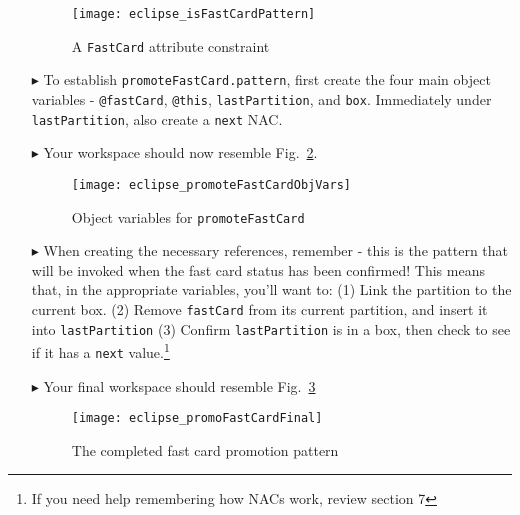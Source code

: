 \begin{itemize}
\begin{figure}[htp]
\begin{center}
  \texttt{[image: eclipse\_isFastCardPattern]}
  \caption{A \texttt{FastCard} attribute constraint}
  \label{fig:isFastCardPattern}
\end{center}
\end{figure}

\item[$\blacktriangleright$] To establish \texttt{promoteFastCard.pattern}, first create the four main object variables - \texttt{@fastCard}, \texttt{@this},
\texttt{lastPartition}, and \texttt{box}. Immediately under \texttt{lastPartition}, also create a \texttt{next} NAC.

\vspace{0.5cm}

\item[$\blacktriangleright$] Your workspace should now resemble Fig.~\ref{fig:objVarFastCard}.

\begin{figure}[htp]
\begin{center}
  \texttt{[image: eclipse\_promoteFastCardObjVars]}
  \caption{Object variables for \texttt{promoteFastCard}}
  \label{fig:objVarFastCard}
\end{center}
\end{figure}

\item[$\blacktriangleright$] When creating the necessary references, remember - this is the pattern that will be invoked when the fast card status has been
confirmed! This means that, in the appropriate variables, you'll want to:
(1) Link the partition to the current box.
(2) Remove \texttt{fastCard} from its current partition, and insert it into \texttt{lastPartition}
(3) Confirm \texttt{lastPartition} is in a box, then check to see if it has a \texttt{next} value.\footnote{If you need help remembering how NACs work, review
section 7}

\vspace{0.5cm}

\item[$\blacktriangleright$] Your final workspace should resemble Fig.~\ref{fig:promoFastCardFinal}

\newpage

\vspace*{1cm}

\begin{figure}[htp]
\begin{center}
  \texttt{[image: eclipse\_promoFastCardFinal]}
  \caption{The completed fast card promotion pattern}
  \label{fig:promoFastCardFinal}
\end{center}
\end{figure}


\end{itemize}
